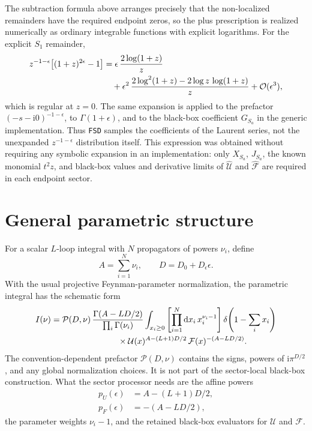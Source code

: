 \documentclass[11pt]{article}
\newcommand{\dd}{\mathrm d}
\newcommand{\ii}{\mathrm i}
\newcommand{\eps}{\epsilon}
\newcommand{\U}{\mathcal U}
\newcommand{\F}{\mathcal F}
\newcommand{\hU}{\widehat{\mathcal U}}
\newcommand{\hF}{\widehat{\mathcal F}}
\begin{document}
The subtraction formula above arranges precisely that the non-localized
remainders have the required endpoint zeros, so the plus prescription is
realized numerically as ordinary integrable functions with explicit logarithms.
For the explicit \(S_1\) remainder,
\begin{align}
  z^{-1-\eps}
  \bigl[(1+z)^{2\eps}-1\bigr]
  &=
  \eps\,\frac{2\log(1+z)}{z}
  \notag\\
  &\quad
  +
  \eps^2\,
  \frac{
    2\log^2(1+z)-2\log z\,\log(1+z)
  }{z}
  +
  \mathcal O(\eps^3),
\end{align}
which is regular at \(z=0\).  The same expansion is applied to the prefactor
\((-s-\ii0)^{-1-\eps}\), to \(\Gamma(1+\eps)\), and to the black-box
coefficient \(G_{S_a}\) in the generic implementation.  Thus \texttt{FSD}
samples the coefficients of the Laurent series, not the unexpanded
\(z^{-1-\eps}\) distribution itself.
This expression was obtained without requiring any symbolic expansion in an
implementation: only \(X_{S_a}\), \(J_{S_a}\), the known monomial \(t^2z\), and
black-box values and derivative limits of \(\hU\) and \(\hF\) are required in
each endpoint sector.

\section{General parametric structure}

For a scalar \(L\)-loop integral with \(N\) propagators of powers
\(\nu_i\), define
\begin{equation}
  A=\sum_{i=1}^{N}\nu_i,
  \qquad
  D=D_0+D_\eps\eps .
\end{equation}
With the usual projective Feynman-parameter normalization, the parametric
integral has the schematic form
\begin{align}
  I(\nu)
  &=
  \mathcal P(D,\nu)\,
  \frac{\Gamma(A-LD/2)}{\prod_i\Gamma(\nu_i)}
  \int_{x_i\geq0}
  \left[\prod_{i=1}^{N}\dd x_i\,x_i^{\nu_i-1}\right]
  \delta\!\left(1-\sum_i x_i\right)
  \notag\\
  &\hspace{2.8cm}\times
  \U(x)^{A-(L+1)D/2}\,
  \F(x)^{-(A-LD/2)} .
\end{align}
The convention-dependent prefactor \(\mathcal P(D,\nu)\) contains the signs,
powers of \(\ii\pi^{D/2}\), and any global normalization choices.  It is not
part of the sector-local black-box construction.  What the sector processor
needs are the affine powers
\begin{align}
  p_U(\eps)&=A-(L+1)D/2,\\
  p_F(\eps)&=-(A-LD/2),
\end{align}
the parameter weights \(\nu_i-1\), and the retained black-box evaluators for
\(\U\) and \(\F\).
\end{document}
